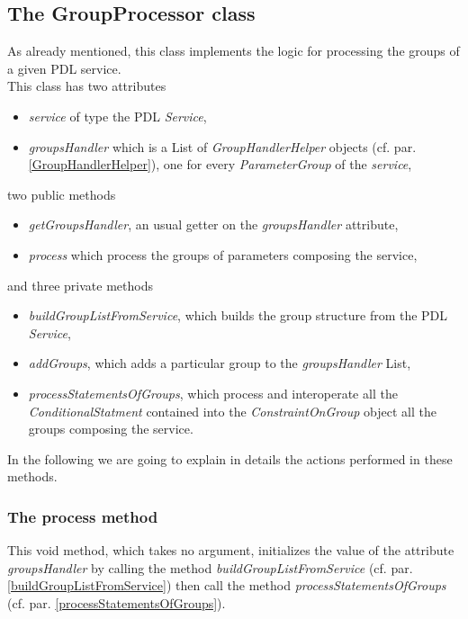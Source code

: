 \documentclass[a4paper,11pt] {ivoa}
\begin{document}
\subsection{The GroupProcessor class}\label{groupProcessor}
As already mentioned, this class implements the logic for processing the groups of a given PDL service.\\
This class has two attributes 
\begin{itemize}
\item {\it service} of type the PDL {\it Service},
\item {\it groupsHandler} which is a List of {\it GroupHandlerHelper} objects  (cf. par. \ref{GroupHandlerHelper}), one for every {\it ParameterGroup} of the {\it service},
\end{itemize}
two public methods
\begin{itemize}
\item {\it getGroupsHandler}, an usual getter on the {\it groupsHandler} attribute,
\item  {\it process} which process the groups of parameters composing the service, 
\end{itemize}
and three private methods
\begin{itemize}
\item {\it buildGroupListFromService}, which builds the group structure from the PDL {\it Service},
\item {\it addGroups}, which adds a particular group to the  {\it groupsHandler} List,
\item {\it processStatementsOfGroups}, which process and interoperate all the {\it ConditionalStatment} contained into the {\it ConstraintOnGroup} object all the groups composing the service.
\end{itemize}
In the following we are going to explain in details the actions performed in these methods.

\subsubsection{The process method}\label{process}
This void method, which takes no argument, initializes the value of the attribute {\it groupsHandler} by calling the method 
{\it buildGroupListFromService} (cf. par. \ref{buildGroupListFromService}) then call the method {\it processStatementsOfGroups} (cf. par. \ref{processStatementsOfGroups}).
 
\end{document}
